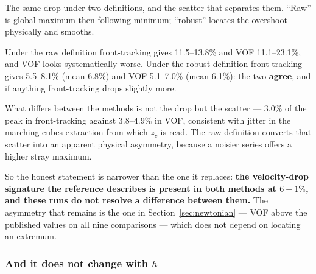 \begin{table}[htbp]
\centering
\caption{The same drop under two definitions, and the scatter that separates
them. ``Raw'' is global maximum then following minimum; ``robust'' locates the
overshoot physically and smooths.}
\label{tab:dropdef}
\small
\begin{adjustbox}{max width=\linewidth}
\end{adjustbox}
\end{table}

Under the raw definition front-tracking gives 11.5--13.8\% and VOF 11.1--23.1\%,
and VOF looks systematically worse. Under the robust definition front-tracking
gives 5.5--8.1\% (mean 6.8\%) and VOF 5.1--7.0\% (mean 6.1\%): the two
\textbf{agree}, and if anything front-tracking drops slightly more.

What differs between the methods is not the drop but the scatter --- $3.0\%$ of
the peak in front-tracking against $3.8$--$4.9\%$ in VOF, consistent with jitter
in the marching-cubes extraction from which $z_c$ is read. The raw definition
converts that scatter into an apparent physical asymmetry, because a noisier
series offers a higher stray maximum.

So the honest statement is narrower than the one it replaces: \textbf{the
velocity-drop signature the reference describes is present in both methods at
$6\pm1\%$, and these runs do not resolve a difference between them.} The
asymmetry that remains is the one in Section~\ref{sec:newtonian} --- VOF above
the published values on all nine comparisons --- which does not depend on
locating an extremum.

\subsubsection{And it does not change with $h$}

